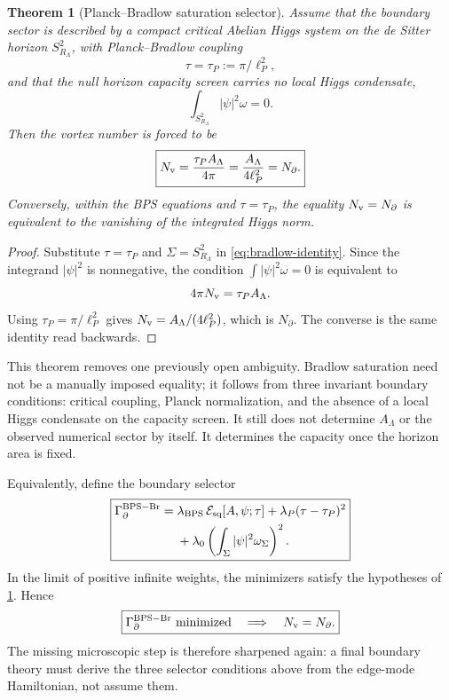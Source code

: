 \documentclass[aps,prd,reprint,nofootinbib,superscriptaddress,floatfix]{revtex4-2}
\numberwithin{equation}{section}
\theoremstyle{definition}
\theoremstyle{plain}
\newtheorem{theorem}{Theorem}[section]
\newcommand{\Ncap}{N_{\partial}}
\begin{document}
\begin{theorem}[Planck--Bradlow saturation selector]
\label{thm:planck-bradlow-selector}
Assume that the boundary sector is described by a compact critical Abelian
Higgs system on the de Sitter horizon \(S^2_{R_\Lambda}\), with Planck--Bradlow
coupling
\[
\tau=\tau_P:=\pi/\ell_P^2,
\]
and that the null horizon capacity screen carries no local Higgs condensate,
\[
\int_{S^2_{R_\Lambda}}|\psi|^2\omega=0.
\]
Then the vortex number is forced to be
\begin{equation}
\boxed{
N_{\rm v}
=
\frac{\tau_P A_\Lambda}{4\pi}
=
\frac{A_\Lambda}{4\ell_P^2}
=
\Ncap .
}
\end{equation}
Conversely, within the BPS equations and \(\tau=\tau_P\), the equality
\(N_{\rm v}=\Ncap\) is equivalent to the vanishing of the integrated Higgs
norm.
\end{theorem}

\begin{proof}
Substitute \(\tau=\tau_P\) and \(\Sigma=S^2_{R_\Lambda}\) in
\cref{eq:bradlow-identity}.  Since the integrand \(|\psi|^2\) is
nonnegative, the condition \(\int|\psi|^2\omega=0\) is equivalent to
\[
4\pi N_{\rm v}=\tau_P A_\Lambda.
\]
Using \(\tau_P=\pi/\ell_P^2\) gives \(N_{\rm v}=A_\Lambda/(4\ell_P^2)\), which
is \(\Ncap\).  The converse is the same identity read backwards.
\end{proof}

This theorem removes one previously open ambiguity.  Bradlow saturation need
not be a manually imposed equality; it follows from three invariant boundary
conditions: critical coupling, Planck normalization, and the absence of a
local Higgs condensate on the capacity screen.  It still does not determine
\(A_\Lambda\) or the observed numerical sector by itself.  It determines the
capacity once the horizon area is fixed.

Equivalently, define the boundary selector
\begin{equation}
\boxed{
\begin{aligned}
\Gamma_{\partial}^{\rm BPS-Br}
={}&
\lambda_{\rm BPS}\,\mathcal E_{\rm sq}[A,\psi;\tau]
+\lambda_P(\tau-\tau_P)^2\\
&+
\lambda_0
\left(
\int_\Sigma |\psi|^2\omega_\Sigma
\right)^2 .
\end{aligned}}
\end{equation}
In the limit of positive infinite weights, the minimizers satisfy the
hypotheses of \cref{thm:planck-bradlow-selector}.  Hence
\[
\boxed{
\Gamma_{\partial}^{\rm BPS-Br}\ {\rm minimized}
\quad\Longrightarrow\quad
N_{\rm v}=\Ncap .
}
\]
The missing microscopic step is therefore sharpened again: a final boundary
theory must derive the three selector conditions above from the edge-mode
Hamiltonian, not assume them.
\end{document}
